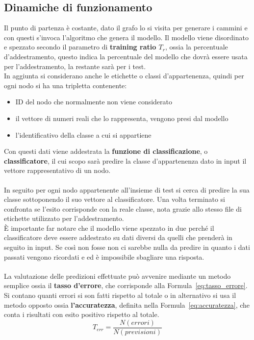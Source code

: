 \subsection{Dinamiche di funzionamento}
Il punto di partenza è costante, dato il grafo lo si visita per generare i cammini e con questi s'invoca l'algoritmo che genera il modello. Il modello viene disordinato e spezzato secondo il parametro di \textbf{training ratio $T_r$}, ossia la percentuale d'addestramento, questo indica la percentuale del modello che dovrà essere usata per l'addestramento, la restante sarà per i test.\\
In aggiunta si considerano anche le etichette o classi d'appartenenza, quindi per ogni nodo si ha una tripletta contenente:
\begin{itemize}
	\item ID del nodo che normalmente non viene considerato
	\item il vettore di numeri reali che lo rappresenta, vengono presi dal modello
	\item l'identificativo della classe a cui si appartiene
\end{itemize}
Con questi dati viene addestrata la \textbf{funzione di classificazione}, o \textbf{classificatore}, il cui scopo sarà predire la classe d'appartenenza dato in input il vettore rappresentativo di un nodo.\\
\\
In seguito per ogni nodo appartenente all'insieme di test si cerca di predire la sua classe sottoponendo il suo vettore al classificatore. Una volta terminato si confronta se l'esito corrisponde con la reale classe, nota grazie allo stesso file di etichette utilizzato per l'addestramento.\\
È importante far notare che il modello viene spezzato in due perché il classificatore deve essere addestrato su dati diversi da quelli che prenderà in seguito in input. Se così non fosse non ci sarebbe nulla da predire in quanto i dati passati vengono ricordati e ed è impossibile sbagliare una risposta.\\
\\
La valutazione delle predizioni effettuate può avvenire mediante un metodo semplice ossia il \textbf{tasso d'errore}, che corrisponde alla Formula~\ref{eq:tasso_errore}. Si contano quanti errori si son fatti rispetto al totale o in alternativo si usa il metodo opposto ossia \textbf{l'accuratezza}, definita nella Formula~\ref{eq:accuratezza}, che conta i risultati con esito positivo rispetto al totale.
%
\begin{equation}
	T_{err} = \frac{N(errori)}{N(previsioni)}
	\label{eq:tasso_errore}
\end{equation}

